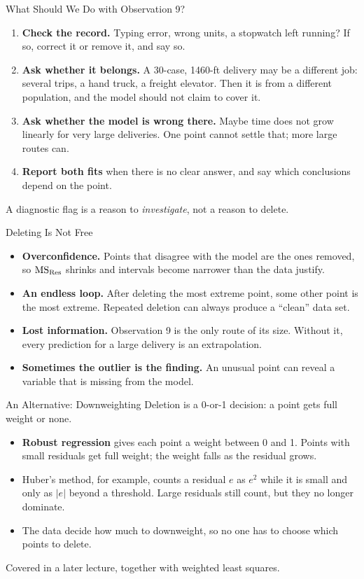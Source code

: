 \begin{frame}{What Should We Do with Observation 9?}
    \begin{enumerate}
        \item \textbf{Check the record.} Typing error, wrong units, a stopwatch left running? If so, correct it or remove it, and say so.
        \item \textbf{Ask whether it belongs.} A 30-case, 1460-ft delivery may be a different job: several trips, a hand truck, a freight elevator. Then it is from a different population, and the model should not claim to cover it.
        \item \textbf{Ask whether the model is wrong there.} Maybe time does not grow linearly for very large deliveries. One point cannot settle that; more large routes can.
        \item \textbf{Report both fits} when there is no clear answer, and say which conclusions depend on the point.
    \end{enumerate}
    \svspace{0.3em}
    A diagnostic flag is a reason to \emph{investigate}, not a reason to delete.
\end{frame}


\begin{frame}{Deleting Is Not Free}
    \begin{itemize}
        \item \textbf{Overconfidence.} Points that disagree with the model are the ones removed, so $\mathrm{MS}_{\mathrm{Res}}$ shrinks and intervals become narrower than the data justify.
        \item \textbf{An endless loop.} After deleting the most extreme point, some other point is the most extreme. Repeated deletion can always produce a ``clean'' data set.
        \item \textbf{Lost information.} Observation 9 is the only route of its size. Without it, every prediction for a large delivery is an extrapolation.
        \item \textbf{Sometimes the outlier is the finding.} An unusual point can reveal a variable that is missing from the model.
    \end{itemize}
\end{frame}


\begin{frame}{An Alternative: Downweighting}
    Deletion is a 0-or-1 decision: a point gets full weight or none.
    \svspace{0.3em}
    \begin{itemize}
        \item \textbf{Robust regression} gives each point a weight between 0 and 1. Points with small residuals get full weight; the weight falls as the residual grows.
        \item Huber's method, for example, counts a residual $e$ as $e^2$ while it is small and only as $|e|$ beyond a threshold. Large residuals still count, but they no longer dominate.
        \item The data decide how much to downweight, so no one has to choose which points to delete.
    \end{itemize}
    \svspace{0.3em}
    Covered in a later lecture, together with weighted least squares.
\end{frame}


